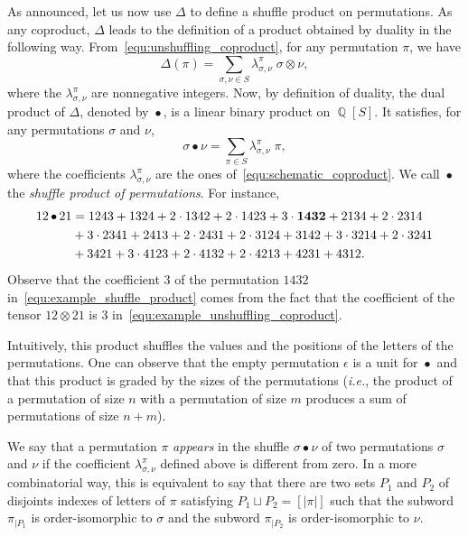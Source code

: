 \documentclass[a4paper]{llncs}
\DeclareMathOperator{\QQ}{\mathbb{Q}}
\DeclareMathOperator{\SHUFFLE}{\bullet}
\begin{document}
As announced, let us now use $\Delta$ to define a shuffle product on
permutations. As any coproduct, $\Delta$ leads to the definition of a
product obtained by duality in the following way.
From~\eqref{equ:unshuffling_coproduct}, for any permutation $\pi$, we
have
\begin{equation} \label{equ:schematic_coproduct}
    \Delta(\pi) =
    \sum_{\sigma, \nu \in S} \lambda_{\sigma, \nu}^\pi \;
    \sigma \otimes \nu,
\end{equation}
where the $\lambda_{\sigma, \nu}^\pi$ are nonnegative integers. Now,
by definition of duality, the dual product of $\Delta$, denoted by
$\SHUFFLE$, is a linear binary product on $\QQ[S]$. It satisfies, for
any permutations $\sigma$ and $\nu$,
\begin{equation}
    \sigma \SHUFFLE \nu =
    \sum_{\pi \in S}
    \lambda_{\sigma, \nu}^\pi \; \pi,
\end{equation}
where the coefficients $\lambda_{\sigma, \nu}^\pi$ are the ones
of~\eqref{equ:schematic_coproduct}. We call $\SHUFFLE$ the
{\em shuffle product of permutations}. For instance,
\begin{equation}\begin{split} \label{equ:example_shuffle_product}
    12 \SHUFFLE 21 & =
    1243 + 1324 + 2 \cdot 1342 + 2 \cdot 1423 + 3 \cdot {\bf 1432} +
    2134 + 2 \cdot 2314 \\
    & + 3 \cdot 2341 + 2413 + 2 \cdot 2431 + 2 \cdot 3124 + 3142 +
    3 \cdot 3214 + 2 \cdot 3241 \\
    & + 3421 + 3 \cdot 4123 + 2 \cdot 4132 + 2 \cdot 4213 + 4231 + 4312.
\end{split}\end{equation}
Observe that the coefficient $3$ of the permutation $1432$
in~\eqref{equ:example_shuffle_product} comes from the fact that the
coefficient of the tensor $12 \otimes 21$ is $3$
in~\eqref{equ:example_unshuffling_coproduct}.

Intuitively, this product shuffles the values and the positions of the
letters of the permutations. One can observe that the empty permutation
$\epsilon$ is a unit for $\SHUFFLE$ and that this product is graded by
the sizes of the permutations ({\em i.e.}, the product of a permutation
of size $n$ with a permutation of size $m$ produces a sum of permutations
of size $n + m$).

We say that a permutation $\pi$ {\em appears} in the shuffle
$\sigma \SHUFFLE \nu$ of two permutations $\sigma$ and $\nu$ if the
coefficient $\lambda_{\sigma, \nu}^\pi$ defined above is different from
zero. In a more combinatorial way, this is equivalent to say that there
are two sets $P_1$ and $P_2$ of disjoints indexes of letters of $\pi$
satisfying $P_1 \sqcup P_2 = [|\pi|]$ such that the subword $\pi_{|P_1}$
is order-isomorphic to $\sigma$ and the subword $\pi_{|P_2}$ is
order-isomorphic to $\nu$.
\end{document}
